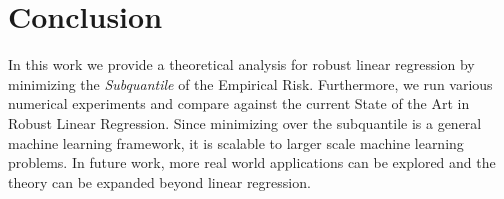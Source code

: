 \documentclass{article} %
\begin{document}
	\section{Conclusion}
	In this work we provide a theoretical analysis for robust linear regression by minimizing the \textit{Subquantile} of the Empirical Risk. Furthermore, we run various numerical experiments and compare against the current State of the Art in Robust Linear Regression. Since minimizing over the subquantile is a general machine learning framework, it is scalable to larger scale machine learning problems. In future work, more real world applications can be explored and the theory can be expanded beyond linear regression. 
	
	\newpage

	
	
	
\end{document}
